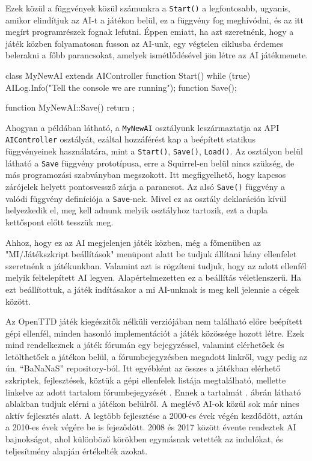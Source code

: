 Ezek közül a függvények közül számunkra a \texttt{Start()} a legfontosabb, ugyanis, amikor elindítjuk az AI-t a játékon belül, ez a függvény fog meghívódni, és az itt megírt programrészek fognak lefutni. Éppen emiatt, ha azt szeretnénk, hogy a játék közben folyamatosan fusson az AI-unk, egy végtelen ciklusba érdemes belerakni a főbb parancsokat, amelyek ismétlődésével jön létre az AI játékmenete.
\begin{cpp}
class MyNewAI extends AIController
{
  function Start()
  {
    while (true) {
      AILog.Info("Tell the console we are running");
    }
  }
  function Save();
}

function MyNewAI::Save()
{
  return {};
}
\end{cpp}
Ahogyan a példában látható, a \texttt{MyNewAI} osztályunk leszármaztatja az API \\ \texttt{AIController} osztályát, ezáltal hozzáférést kap a beépített statikus függvényeinek használatára, mint a \texttt{Start()}, \texttt{Save()}, \texttt{Load()}. Az osztályon belül látható a \texttt{Save} függvény prototípusa, erre a Squirrel-en belül nincs szükség, de más programozási szabványban megszokott. Itt megfigyelhető, hogy kapcsos zárójelek helyett pontosvessző zárja a parancsot. Az alsó \texttt{Save()} függvény a valódi függvény definíciója a \texttt{Save}-nek. Mivel ez az osztály deklaráción kívül helyezkedik el, meg kell adnunk melyik osztályhoz tartozik, ezt a dupla kettőspont előtt tesszük meg.

Ahhoz, hogy ez az AI megjelenjen játék közben, még a főmenüben az "MI/Játékszkript beállítások" menüpont alatt be tudjuk állítani hány ellenfelet szeretnénk a játékunkban. Valamint azt is rögzíteni tudjuk, hogy az adott ellenfél melyik feltelepített AI legyen. Alapértelmezetten ez a beállítás véletlenszerű. Ha ezt beállítottuk, a játék indításakor a mi AI-unknak is meg kell jelennie a cégek között.


Az OpenTTD játék kiegészítők nélküli verziójában nem található előre beépített gépi ellenfél, minden hasonló implementációt a játék közössége hozott létre. Ezek mind rendelkeznek a játék fórumán egy bejegyzéssel, valamint elérhetőek és letölthetőek a játékon belül, a fórumbejegyzésben megadott linkről, vagy pedig az ún. “BaNaNaS” repository-ból. Itt egyébként az összes a játékban elérhető szkriptek, fejlesztések, köztük a gépi ellenfelek listája megtalálható, mellette linkelve az adott tartalom fórumbejegyzését \cite{openttdbananas}. Ennek a tartalmát . ábrán látható ablakban tudjuk elérni a játékon belülről. A meglévő AI-ok közül sok már nincs aktív fejlesztés alatt. A legtöbb fejlesztése a 2000-es évek végén kezdődött, aztán a 2010-es évek végére be is fejeződött. 2008 és 2017 között évente rendeztek AI bajnokságot, ahol különböző körökben egymásnak vetették az indulókat, és teljesítmény alapján értékelték azokat.

